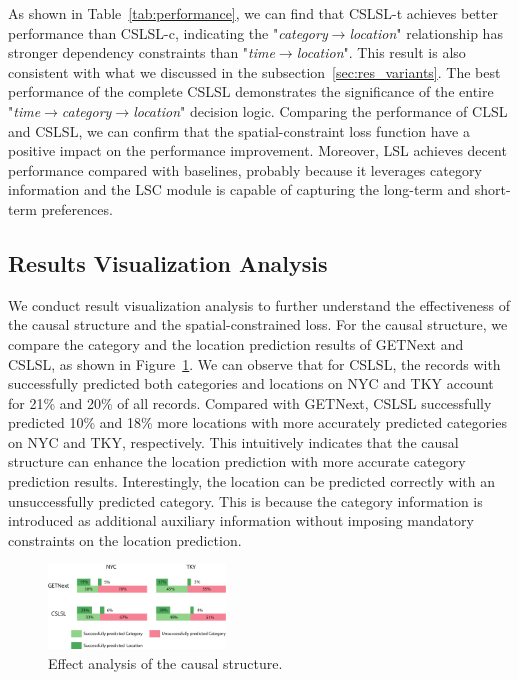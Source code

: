 \documentclass[sigconf]{acmart}
\begin{document}
    As shown in Table~\ref{tab:performance}, we can find that CSLSL-t achieves better performance than CSLSL-c, indicating the "\textit{category$\to$location}" relationship has stronger dependency constraints than "\textit{time$\to$location}". This result is also consistent with what we discussed in the subsection~\ref{sec:res_variants}. 
    The best performance of the complete CSLSL demonstrates the significance of the entire "\textit{time$\to$category$\to$location}" decision logic. Comparing the performance of CLSL and CSLSL, we can confirm that the spatial-constraint loss function have a positive impact on the performance improvement. Moreover, LSL achieves decent performance compared with baselines, probably because it leverages category information and the LSC module is capable of capturing the long-term and short-term preferences.


\subsection{Results Visualization Analysis}

    We conduct result visualization analysis to further understand the effectiveness of the causal structure and the spatial-constrained loss.
    For the causal structure, we compare the category and the location prediction results of GETNext and CSLSL, as shown in Figure~\ref{fig:CT}. We can observe that for CSLSL, the records with successfully predicted both categories and locations on NYC and TKY account for 21\% and 20\% of all records.
    Compared with GETNext, CSLSL successfully predicted 10\% and 18\% more locations with more accurately predicted categories on NYC and TKY, respectively.
    This intuitively indicates that the causal structure can enhance the location prediction with more accurate category prediction results. Interestingly, the location can be predicted correctly with an unsuccessfully predicted category. This is because the category information is introduced as additional auxiliary information without imposing mandatory constraints on the location prediction.

    \begin{figure}[bt]
        \begin{center}
        \includegraphics[width=0.42\textwidth]{figure/analysis_CT.pdf}
        \end{center}
        \caption{Effect analysis of the causal structure.}
        \label{fig:CT}
    \end{figure}
\end{document}

